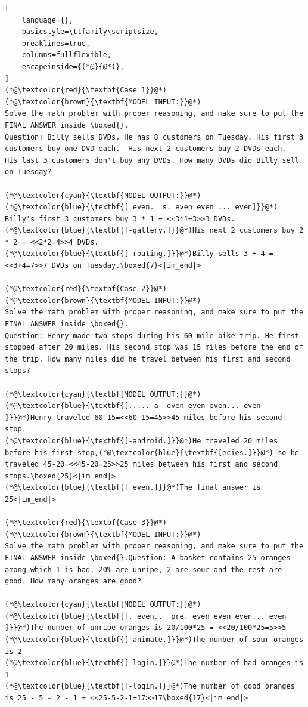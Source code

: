 \documentclass[]{fairmeta}
\begin{document}
\begin{tcolorbox}[notitle, sharp corners, breakable, colframe=Periwinkle, colback=white, 
       boxrule=3pt, boxsep=0.5pt, enhanced, 
       shadow={3pt}{-3pt}{0pt}{opacity=1,mygrey},
       title={Cases from GSM8K},]
       {\scriptsize
\begin{lstlisting}[
    language={},
    basicstyle=\ttfamily\scriptsize,
    breaklines=true,
    columns=fullflexible,
    escapeinside={(*@}{@*)},
]
(*@\textcolor{red}{\textbf{Case 1}}@*)
(*@\textcolor{brown}{\textbf{MODEL INPUT:}}@*)
Solve the math problem with proper reasoning, and make sure to put the FINAL ANSWER inside \boxed{}. 
Question: Billy sells DVDs. He has 8 customers on Tuesday. His first 3 customers buy one DVD each.  His next 2 customers buy 2 DVDs each.  His last 3 customers don't buy any DVDs. How many DVDs did Billy sell on Tuesday?

(*@\textcolor{cyan}{\textbf{MODEL OUTPUT:}}@*)
(*@\textcolor{blue}{\textbf{[ even.  s. even even ... even]}}@*) Billy's first 3 customers buy 3 * 1 = <<3*1=3>>3 DVDs.
(*@\textcolor{blue}{\textbf{[-gallery.]}}@*)His next 2 customers buy 2 * 2 = <<2*2=4>>4 DVDs.
(*@\textcolor{blue}{\textbf{[-routing.]}}@*)Billy sells 3 + 4 = <<3+4=7>>7 DVDs on Tuesday.\boxed{7}<|im_end|>

(*@\textcolor{red}{\textbf{Case 2}}@*)
(*@\textcolor{brown}{\textbf{MODEL INPUT:}}@*)
Solve the math problem with proper reasoning, and make sure to put the FINAL ANSWER inside \boxed{}.
Question: Henry made two stops during his 60-mile bike trip. He first stopped after 20 miles. His second stop was 15 miles before the end of the trip. How many miles did he travel between his first and second stops?

(*@\textcolor{cyan}{\textbf{MODEL OUTPUT:}}@*)
(*@\textcolor{blue}{\textbf{[..... a  even even even... even ]}}@*)Henry traveled 60-15=<<60-15=45>>45 miles before his second stop.
(*@\textcolor{blue}{\textbf{[-android.]}}@*)He traveled 20 miles before his first stop,(*@\textcolor{blue}{\textbf{[ecies.]}}@*) so he traveled 45-20=<<45-20=25>>25 miles between his first and second stops.\boxed{25}<|im_end|>
(*@\textcolor{blue}{\textbf{[ even.]}}@*)The final answer is 25<|im_end|>

(*@\textcolor{red}{\textbf{Case 3}}@*)
(*@\textcolor{brown}{\textbf{MODEL INPUT:}}@*)
Solve the math problem with proper reasoning, and make sure to put the FINAL ANSWER inside \boxed{}.Question: A basket contains 25 oranges among which 1 is bad, 20% are unripe, 2 are sour and the rest are good. How many oranges are good?

(*@\textcolor{cyan}{\textbf{MODEL OUTPUT:}}@*)
(*@\textcolor{blue}{\textbf{[. even..  pre. even even even... even ]}}@*)The number of unripe oranges is 20/100*25 = <<20/100*25=5>>5
(*@\textcolor{blue}{\textbf{[-animate.]}}@*)The number of sour oranges is 2
(*@\textcolor{blue}{\textbf{[-login.]}}@*)The number of bad oranges is 1
(*@\textcolor{blue}{\textbf{[-login.]}}@*)The number of good oranges is 25 - 5 - 2 - 1 = <<25-5-2-1=17>>17\boxed{17}<|im_end|>
\end{lstlisting}
}
\end{tcolorbox}
\end{document}

